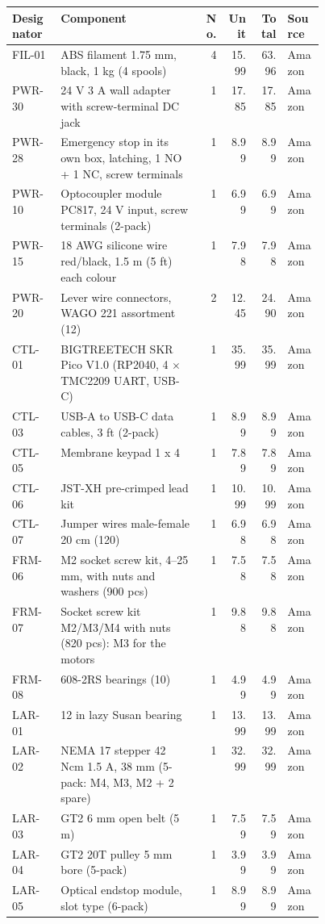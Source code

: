 \begin{tabular}{lp{0.45\linewidth}rrrl}
\textbf{Designator} & \textbf{Component} & \textbf{No.} & \textbf{Unit} & \textbf{Total} & \textbf{Source} \\ \hline
FIL-01 & ABS filament 1.75 mm, black, 1 kg (4 spools) & 4 & 15.99 & 63.96 & Amazon \\
PWR-30 & 24 V 3 A wall adapter with screw-terminal DC jack & 1 & 17.85 & 17.85 & Amazon \\
PWR-28 & Emergency stop in its own box, latching, 1 NO + 1 NC, screw terminals & 1 & 8.99 & 8.99 & Amazon \\
PWR-10 & Optocoupler module PC817, 24 V input, screw terminals (2-pack) & 1 & 6.99 & 6.99 & Amazon \\
PWR-15 & 18 AWG silicone wire red/black, 1.5 m (5 ft) each colour & 1 & 7.98 & 7.98 & Amazon \\
PWR-20 & Lever wire connectors, WAGO 221 assortment (12) & 2 & 12.45 & 24.90 & Amazon \\
CTL-01 & BIGTREETECH SKR Pico V1.0 (RP2040, 4 $\times$ TMC2209 UART, USB-C) & 1 & 35.99 & 35.99 & Amazon \\
CTL-03 & USB-A to USB-C data cables, 3 ft (2-pack) & 1 & 8.99 & 8.99 & Amazon \\
CTL-05 & Membrane keypad 1 x 4 & 1 & 7.89 & 7.89 & Amazon \\
CTL-06 & JST-XH pre-crimped lead kit & 1 & 10.99 & 10.99 & Amazon \\
CTL-07 & Jumper wires male-female 20 cm (120) & 1 & 6.98 & 6.98 & Amazon \\
FRM-06 & M2 socket screw kit, 4--25 mm, with nuts and washers (900 pcs) & 1 & 7.58 & 7.58 & Amazon \\
FRM-07 & Socket screw kit M2/M3/M4 with nuts (820 pcs): M3 for the motors & 1 & 9.88 & 9.88 & Amazon \\
FRM-08 & 608-2RS bearings (10) & 1 & 4.99 & 4.99 & Amazon \\
LAR-01 & 12 in lazy Susan bearing & 1 & 13.99 & 13.99 & Amazon \\
LAR-02 & NEMA 17 stepper 42 Ncm 1.5 A, 38 mm (5-pack: M4, M3, M2 + 2 spare) & 1 & 32.99 & 32.99 & Amazon \\
LAR-03 & GT2 6 mm open belt (5 m) & 1 & 7.59 & 7.59 & Amazon \\
LAR-04 & GT2 20T pulley 5 mm bore (5-pack) & 1 & 3.99 & 3.99 & Amazon \\
LAR-05 & Optical endstop module, slot type (6-pack) & 1 & 8.99 & 8.99 & Amazon \\

\end{tabular}
